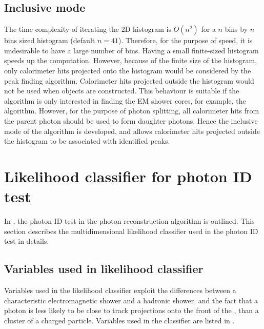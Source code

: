 \subsection{Inclusive mode}
\label{sec:photonPeakFindingInclusive}


The time complexity of iterating the 2D histogram is $O(n^2)$ for a $n$ bins by  $n$ bins sized histogram (default $n = 41$). Therefore, for the purpose of speed, it is undesirable to have  a large number of bins. Having a small finite-sized histogram speeds up the computation. However, because of the finite size of the histogram, only  calorimeter hits  projected onto the histogram would be considered by the peak finding algorithm. Calorimeter hits projected outside the histogram would not be used when \ShowerPeak objects are constructed. This behaviour is suitable if the algorithm is only interested in finding the EM shower cores, for example, the \PhotonReconstruction algorithm. However, for the purpose of photon splitting, all calorimeter hits from the parent photon should be used to form daughter photons. Hence the inclusive mode of the \peakFinding algorithm is developed, and allows calorimeter hits projected outside the histogram to be associated with identified peaks.


\section{Likelihood classifier for photon ID test}
\label{sec:photonLikelihood}

In , the photon ID test in the photon reconstruction algorithm is outlined. This section describes the multidimensional likelihood classifier used in the photon ID test in details.


\subsection{Variables used in likelihood classifier }

Variables used in the likelihood classifier exploit the differences between a characteristic electromagnetic shower and a hadronic shower, and the fact that a photon is less likely to be close to track projections onto the front of the \ECAL, than a cluster of a charged particle. Variables used in the classifier are listed in .

